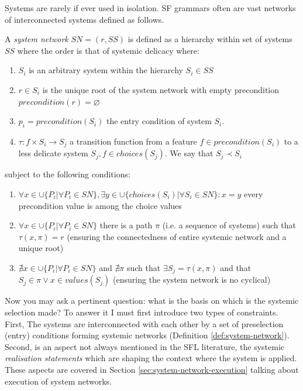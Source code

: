 Systems are rarely if ever used in isolation. SF grammars often are vast networks of interconnected systems defined as follows. 

\begin{definition}\label{def:system-network}
	A \textit{system network} $SN=(r,SS)$ is defined as a hierarchy within set of systems $SS$ where the order is that of systemic delicacy where:
	\begin{enumerate}
		\item $S_{i}$ is an arbitrary system within the hierarchy $S_{i} \in SS $
		\item $r \in S_{i}$ is the unique root of the system network with empty precondition $precondition(r)=\varnothing $
		\item $p_{i} = precondition(S_{i})$ the entry condition of system $S_{i}$.
		\item $\tau: f \times S_{i} \rightarrow S_{j}$ a transition function from a feature $f \in precondition(S_{i})$ to a less delicate system $S_{j}, f \in choices(S_{j})$. We say that $S_{j} \prec S_{i}$
	\end{enumerate}
	subject to the following conditions:
	\begin{enumerate}
		\item $\forall x \in \cup \{ P_{i}| \forall P_{i} \in SN \}, \exists y \in \cup \{ choices(S_{i})| \forall S_{i} \in SN \}: x=y$ every precondition value is among the choice values
		\item $\forall x \in \cup \{ P_{i}| \forall P_{i} \in SN \}$ there is a path $\pi$ (i.e. a sequence of systems) such that $\tau(x,\pi)=r$ (ensuring the connectedness of entire systemic network and a unique root)
		\item $\nexists x \in \cup \{ P_{i}| \forall P_{i} \in SN \}$ and $\nexists \pi$ such that $\exists S_{j}=\tau(x,\pi)$ and that $ S_{j} \in \pi \vee x \in values(S_{j}) $ (ensuring the system network is no cyclical)
	\end{enumerate}
\end{definition}

Now you may ask a pertinent question: what is the basis on which is the systemic selection made? To answer it I must first introduce two types of constraints. 
First, The systems are interconnected with each other by a set of preselection (entry) conditions forming systemic networks (Definition \ref{def:system-network}). Second, is an aspect not always mentioned in the SFL literature, the systemic \textit{realisation statements} which are shaping the context where the system is applied. These aspects are covered in Section \ref{sec:system-network-execution} talking about execution of system networks.  

